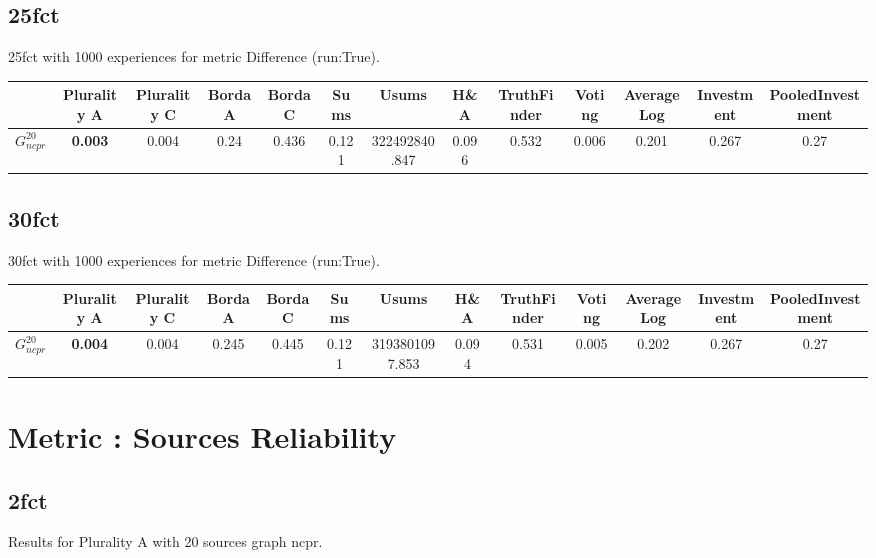 \documentclass{article}
\newcommand{\graph}[2]{$G_{#1}^{#2}$}
\begin{document}
\subsection{25fct}

25fct with 1000 experiences for metric Difference (run:True).

\noindent\begin{tabular}{|l|c|c|c|c|c|c|c|c|c|c|c|c|}
\hline
& Plurality A& Plurality C& Borda A& Borda C& Sums& Usums& H\&A& TruthFinder& Voting& AverageLog& Investment& PooledInvestment\\
\hline
\graph{ncpr}{20} &\textbf{0.003}&0.004&0.24&0.436&0.121&322492840.847&0.096&0.532&0.006&0.201&0.267&0.27\\
\hline
\end{tabular}
\newpage

\subsection{30fct}

30fct with 1000 experiences for metric Difference (run:True).

\noindent\begin{tabular}{|l|c|c|c|c|c|c|c|c|c|c|c|c|}
\hline
& Plurality A& Plurality C& Borda A& Borda C& Sums& Usums& H\&A& TruthFinder& Voting& AverageLog& Investment& PooledInvestment\\
\hline
\graph{ncpr}{20} &\textbf{0.004}&0.004&0.245&0.445&0.121&3193801097.853&0.094&0.531&0.005&0.202&0.267&0.27\\
\hline
\end{tabular}
\newpage
\newpage
\section{Metric : Sources Reliability}

\newpage
\newpage

\subsection{2fct}

\noindent Results for Plurality A with 20 sources graph ncpr.
\end{document}
